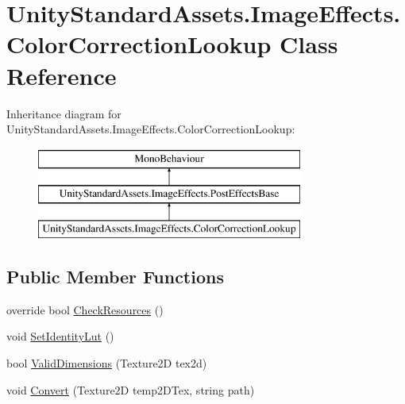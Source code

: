 \hypertarget{class_unity_standard_assets_1_1_image_effects_1_1_color_correction_lookup}{}\section{Unity\+Standard\+Assets.\+Image\+Effects.\+Color\+Correction\+Lookup Class Reference}
\label{class_unity_standard_assets_1_1_image_effects_1_1_color_correction_lookup}
Inheritance diagram for Unity\+Standard\+Assets.\+Image\+Effects.\+Color\+Correction\+Lookup\+:\begin{figure}[H]
\begin{center}
\leavevmode
\includegraphics[height=3.000000cm]{class_unity_standard_assets_1_1_image_effects_1_1_color_correction_lookup}
\end{center}
\end{figure}
\subsection*{Public Member Functions}
\begin{DoxyCompactItemize}
\item 
override bool \mbox{\hyperlink{class_unity_standard_assets_1_1_image_effects_1_1_color_correction_lookup_a509c6ad96fc5b0d58ac768c076bd84cf}{Check\+Resources}} ()
\item 
void \mbox{\hyperlink{class_unity_standard_assets_1_1_image_effects_1_1_color_correction_lookup_a72b9f5d589f1e274264bd0f5c6ad4e05}{Set\+Identity\+Lut}} ()
\item 
bool \mbox{\hyperlink{class_unity_standard_assets_1_1_image_effects_1_1_color_correction_lookup_a0f74566f8e45868f7b5e2e98e08f28b5}{Valid\+Dimensions}} (Texture2D tex2d)
\item 
void \mbox{\hyperlink{class_unity_standard_assets_1_1_image_effects_1_1_color_correction_lookup_ad3838751bf4f0c07e63ef530e3b7cff0}{Convert}} (Texture2D temp2\+D\+Tex, string path)
\end{DoxyCompactItemize}
